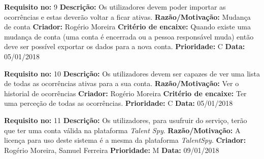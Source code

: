 \begin{framed}
\noindent\textbf{Requisito no:} 9
\qquad
\vspace{2mm}
\newline\textbf{Descrição:} Os utilizadores devem poder importar as ocorrências e estas deverão voltar a ficar ativas.
\vspace{1mm}
\newline\textbf{Razão/Motivação:} Mudança de conta
\vspace{1mm}
\newline\textbf{Criador:} Rogério Moreira
\vspace{1mm}
\newline\textbf{Critério de encaixe:} Quando existe uma mudança de conta (uma conta é encerrada ou a pessoa responsável muda) então deve ser possível exportar os dados para a nova conta.
\vspace{1mm}
\newline\textbf{Prioridade:} C
\vspace{1mm}
\newline\textbf{Data:} 05/01/2018
\end{framed}

\begin{framed}
\noindent\textbf{Requisito no:} 10
\qquad
\vspace{2mm}
\newline\textbf{Descrição:} Os utilizadores devem ser capazes de ver uma lista de todas as ocorrências ativas para a sua conta.
\vspace{1mm}
\newline\textbf{Razão/Motivação:} Ver o historial de ocorrências
\vspace{1mm}
\newline\textbf{Criador:} Rogério Moreira
\vspace{1mm}
\newline\textbf{Critério de encaixe:} Ter uma perceção de todas as ocorrências.
\vspace{1mm}
\newline\textbf{Prioridade:} C
\vspace{1mm}
\newline\textbf{Data:} 05/01/2018
\end{framed}

\newpage

\begin{framed}
\noindent\textbf{Requisito no:} 11
\vspace{2mm}
\newline\textbf{Descrição:} Os utilizadores, para usufruir do serviço, terão que ter uma conta válida na plataforma \emph{Talent Spy}.
\vspace{1mm}
\newline\textbf{Razão/Motivação:} A licença para uso deste sistema é a mesma da plataforma \emph{TalentSpy}.
\vspace{1mm}
\newline\textbf{Criador:} Rogério Moreira, Samuel Ferreira
\vspace{1mm}
\newline\textbf{Prioridade:} M
\vspace{1mm}
\newline\textbf{Data:} 09/01/2018
\end{framed}
